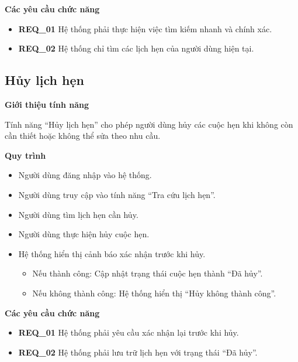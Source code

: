 \noindent \textbf{Các yêu cầu chức năng}
\begin{itemize}
    \item \textbf{REQ\_01} Hệ thống phải thực hiện việc tìm kiếm nhanh và chính xác.
    \item \textbf{REQ\_02} Hệ thống chỉ tìm các lịch hẹn của người dùng hiện tại.
\end{itemize}

\subsection{Hủy lịch hẹn}

\noindent \textbf{Giới thiệu tính năng}

Tính năng ``Hủy lịch hẹn'' cho phép người dùng hủy các cuộc hẹn khi không còn cần thiết hoặc không thể sửa theo nhu cầu.

\noindent \textbf{Quy trình}
\begin{itemize}
    \item Người dùng đăng nhập vào hệ thống.
    \item Người dùng truy cập vào tính năng ``Tra cứu lịch hẹn''.
    \item Người dùng tìm lịch hẹn cần hủy.
    \item Người dùng thực hiện hủy cuộc hẹn.
    \item Hệ thống hiển thị cảnh báo xác nhận trước khi hủy.
    \begin{itemize}
        \item Nếu thành công: Cập nhật trạng thái cuộc hẹn thành ``Đã hủy''.
        \item Nếu không thành công: Hệ thống hiển thị ``Hủy không thành công''.
    \end{itemize}
\end{itemize}

\noindent \textbf{Các yêu cầu chức năng}
\begin{itemize}
    \item \textbf{REQ\_01} Hệ thống phải yêu cầu xác nhận lại trước khi hủy.
    \item \textbf{REQ\_02} Hệ thống phải lưu trữ lịch hẹn với trạng thái ``Đã hủy''.
\end{itemize}